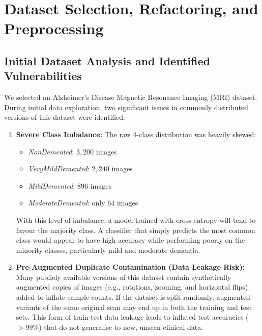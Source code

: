 \documentclass[11pt]{article}
\begin{document}
	\section{Dataset Selection, Refactoring, and Preprocessing}
	\subsection{Initial Dataset Analysis and Identified Vulnerabilities}
	We selected an Alzheimer's Disease Magnetic Resonance Imaging (MRI) dataset. During initial data exploration, two significant issues in commonly distributed versions of this dataset were identified:
	\begin{enumerate}
		\item \textbf{Severe Class Imbalance:}
		The raw 4-class distribution was heavily skewed:
		\begin{itemize}
			\item \textit{NonDemented}: $3,200$ images
			\item \textit{VeryMildDemented}: $2,240$ images
			\item \textit{MildDemented}: $896$ images
			\item \textit{ModerateDemented}: only $64$ images
		\end{itemize}
		With this level of imbalance, a model trained with cross-entropy will tend to favour the majority class. A classifier that simply predicts the most common class would appear to have high accuracy while performing poorly on the minority classes, particularly mild and moderate dementia.
		
		\item \textbf{Pre-Augmented Duplicate Contamination (Data Leakage Risk):}
		Many publicly available versions of this dataset contain synthetically augmented copies of images (e.g., rotations, zooming, and horizontal flips) added to inflate sample counts. If the dataset is split randomly, augmented variants of the same original scan may end up in both the training and test sets. This form of train-test data leakage leads to inflated test accuracies ($>99\%$) that do not generalise to new, unseen clinical data.
	\end{enumerate}
\end{document}
